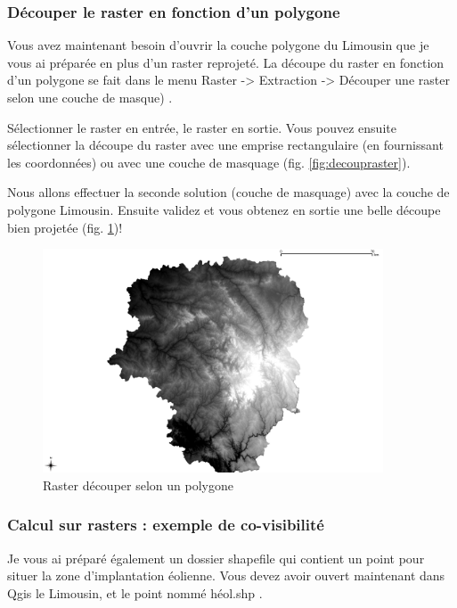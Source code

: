 \documentclass[a4paper, 11pt]{article}
\begin{document}
    \subsubsection{Découper le raster en fonction d’un polygone}

    Vous avez maintenant besoin d'ouvrir la couche polygone du Limousin que je vous ai préparée en plus d'un raster reprojeté. La découpe du raster en fonction d'un polygone se fait dans le menu Raster -> Extraction -> Découper une raster selon une couche de masque) .

    Sélectionner le raster en entrée, le raster en sortie. Vous pouvez ensuite sélectionner la découpe du raster avec une emprise rectangulaire (en fournissant les coordonnées) ou avec une couche de masquage (fig. \ref{fig:decoupraster}).

    Nous allons effectuer la seconde solution (couche de masquage) avec la couche de polygone Limousin. Ensuite validez et vous obtenez en sortie une belle découpe bien projetée (fig. \ref{fig:carte_limousin_decoup})!

    \begin{figure}
    \centering
    \includegraphics[width=0.9\textwidth]{img/rasterLimousin}
      \caption{Raster découper selon un polygone}\label{fig:carte_limousin_decoup}
    \end{figure}

    \subsubsection{Calcul sur rasters : exemple de co-visibilité}

    Je vous ai préparé également un dossier shapefile qui contient un point pour situer la zone d'implantation éolienne. Vous devez avoir ouvert maintenant dans Qgis le Limousin, et le point nommé héol.shp .
\end{document}
